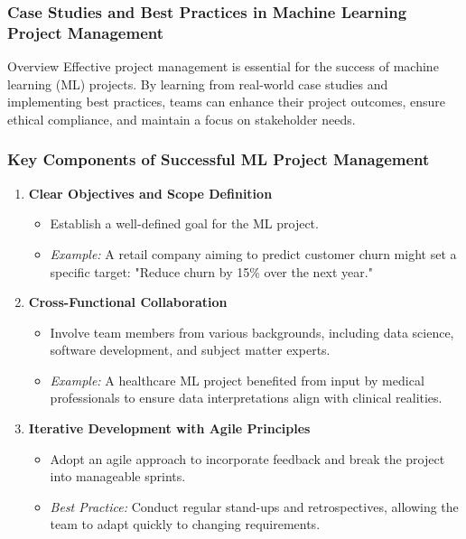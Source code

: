 \documentclass[aspectratio=169]{beamer}
\begin{document}
\begin{frame}[fragile]
    \frametitle{Case Studies and Best Practices in Machine Learning Project Management}
    \begin{block}{Overview}
        Effective project management is essential for the success of machine learning (ML) projects. By learning from real-world case studies and implementing best practices, teams can enhance their project outcomes, ensure ethical compliance, and maintain a focus on stakeholder needs.
    \end{block}
\end{frame}

\begin{frame}[fragile]
    \frametitle{Key Components of Successful ML Project Management}
    \begin{enumerate}
        \item \textbf{Clear Objectives and Scope Definition}
            \begin{itemize}
                \item Establish a well-defined goal for the ML project.
                \item \textit{Example:} A retail company aiming to predict customer churn might set a specific target: "Reduce churn by 15\% over the next year."
            \end{itemize}
        \item \textbf{Cross-Functional Collaboration}
            \begin{itemize}
                \item Involve team members from various backgrounds, including data science, software development, and subject matter experts.
                \item \textit{Example:} A healthcare ML project benefited from input by medical professionals to ensure data interpretations align with clinical realities.
            \end{itemize}
        \item \textbf{Iterative Development with Agile Principles}
            \begin{itemize}
                \item Adopt an agile approach to incorporate feedback and break the project into manageable sprints.
                \item \textit{Best Practice:} Conduct regular stand-ups and retrospectives, allowing the team to adapt quickly to changing requirements.
            \end{itemize}
    \end{enumerate}
\end{frame}
\end{document}
